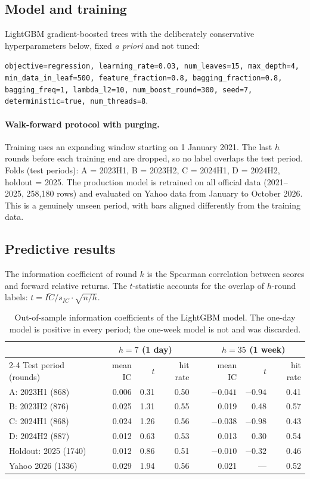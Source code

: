 \documentclass[11pt,a4paper]{article}
\newcommand{\code}[1]{\texttt{#1}}
\begin{document}
\subsection{Model and training}
LightGBM gradient-boosted trees with the deliberately conservative hyperparameters below, fixed \emph{a priori} and
not tuned:
\begin{center}\small
\code{objective=regression, learning\_rate=0.03, num\_leaves=15, max\_depth=4, min\_data\_in\_leaf=500,
feature\_fraction=0.8, bagging\_fraction=0.8, bagging\_freq=1, lambda\_l2=10, num\_boost\_round=300,
seed=7, deterministic=true, num\_threads=8}.
\end{center}
\paragraph{Walk-forward protocol with purging.} Training uses an expanding window starting on 1 January 2021. The last
$h$ rounds before each training end are dropped, so no label overlaps the test period. Folds (test periods): A = 2023H1,
B = 2023H2, C = 2024H1, D = 2024H2, holdout = 2025. The production model is retrained on all official data
(2021--2025, 258{,}180 rows) and evaluated on Yahoo data from January to October 2026. This is a genuinely unseen period,
with bars aligned differently from the training data.

\subsection{Predictive results}
The information coefficient of round $k$ is the Spearman correlation between scores and forward relative returns. The
$t$-statistic accounts for the overlap of $h$-round labels: $t=\overline{IC}/s_{IC}\cdot\sqrt{n/h}$.

\begin{table}[h]
\centering\small
\begin{tabular}{lrrrrrrr}
\toprule
 & \multicolumn{3}{c}{$h=7$ (1 day)} & & \multicolumn{3}{c}{$h=35$ (1 week)} \\
\cmidrule{2-4}\cmidrule{6-8}
Test period (rounds) & mean IC & $t$ & hit rate & & mean IC & $t$ & hit rate \\
\midrule
A: 2023H1 (868) & 0.006 & 0.31 & 0.50 & & $-0.041$ & $-0.94$ & 0.41 \\
B: 2023H2 (876) & 0.025 & 1.31 & 0.55 & & 0.019 & 0.48 & 0.57 \\
C: 2024H1 (868) & 0.024 & 1.26 & 0.56 & & $-0.038$ & $-0.98$ & 0.43 \\
D: 2024H2 (887) & 0.012 & 0.63 & 0.53 & & 0.013 & 0.30 & 0.54 \\
Holdout: 2025 (1740) & 0.012 & 0.86 & 0.51 & & $-0.010$ & $-0.32$ & 0.46 \\
Yahoo 2026 (1336) & 0.029 & 1.94 & 0.56 & & 0.021 & --- & 0.52 \\
\bottomrule
\end{tabular}
\caption{Out-of-sample information coefficients of the LightGBM model. The one-day model is positive in every period; the
one-week model is not and was discarded.}
\label{tab:ic}
\end{table}
\end{document}
